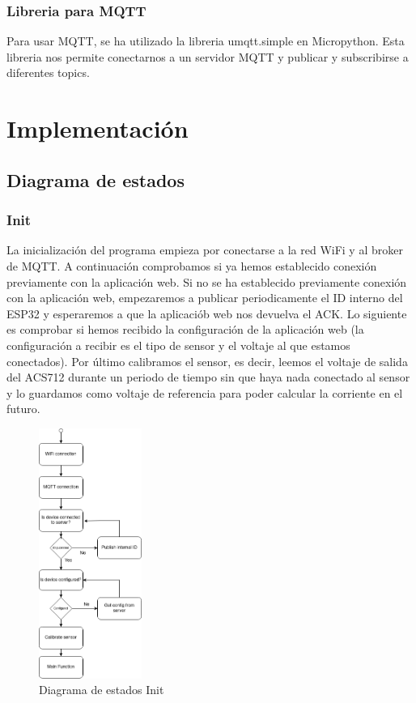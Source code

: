 \begin{titlepage}
\subsubsection{Libreria para MQTT}
Para usar MQTT, se ha utilizado la libreria umqtt.simple\cite{ref22} en Micropython. Esta libreria nos permite conectarnos a un servidor MQTT y publicar y subscribirse a diferentes topics.\\
\newpage
\section{Implementación}
\subsection{Diagrama de estados}
\subsubsection{Init}
La inicialización del programa empieza por conectarse a la red WiFi y al broker de MQTT. A continuación comprobamos si ya hemos establecido conexión previamente con la aplicación web. Si no se ha establecido previamente conexión con la aplicación web, empezaremos a publicar periodicamente el ID interno del ESP32 y esperaremos a que la aplicaciób web nos devuelva el ACK. Lo siguiente es comprobar si hemos recibido la configuración de la aplicación web (la configuración a recibir es el tipo de sensor y el voltaje al que estamos conectados). Por último calibramos el sensor, es decir, leemos el voltaje de salida del ACS712 durante un periodo de tiempo sin que haya nada conectado al sensor y lo guardamos como voltaje de referencia para poder calcular la corriente en el futuro.\\
\begin{figure}[h!]
	\centering
	\includegraphics[width=0.30\textwidth]{imagenes/Init.drawio.png}
	\caption{Diagrama de estados Init}
\end{figure}

\end{titlepage}
